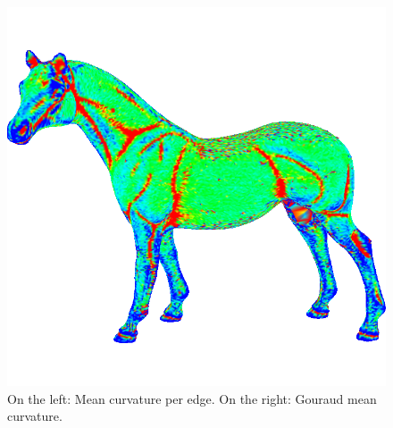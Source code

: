 \begin{figure}[!h]
    \includegraphics[scale=0.42]{images/horse-mcv.png}
    \endminipage\hfill
    \caption{On the left: Mean curvature per edge. On the right: Gouraud mean curvature.}
    \label{fig:comparison-mce-mcv}
\end{figure}